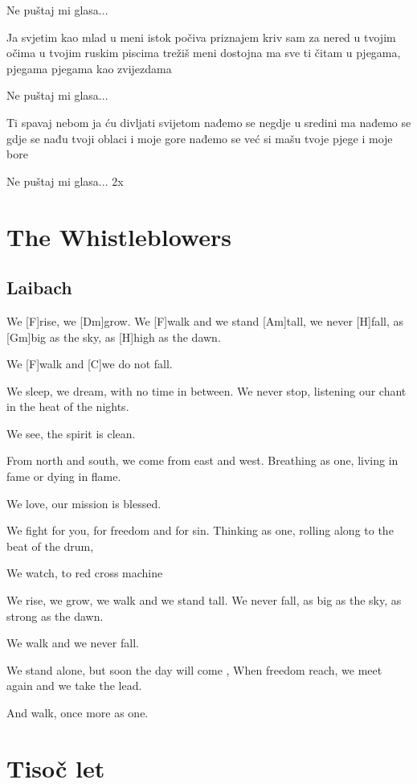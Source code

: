 \documentclass[a4paper,12pt]{article}
\begin{document}
\begin{multicols}{2}
\begin{guitar}
Ne puštaj mi glasa...


Ja svjetim kao mlad 
u meni istok počiva
priznajem kriv sam za nered u tvojim očima
u tvojim ruskim piscima trežiš meni dostojna
ma sve ti čitam u pjegama, pjegama
pjegama kao zvijezdama


Ne puštaj mi glasa...


Ti spavaj nebom ja ću divljati svijetom
nađemo se negdje u sredini
ma nađemo se gdje se nađu
tvoji oblaci i moje gore
nađemo se već si mašu
tvoje pjege i moje bore


Ne puštaj mi glasa... 2x

\end{guitar}
\section{The Whistleblowers}
\subsection*{Laibach}
\begin{guitar}
We [F]rise, we [Dm]grow.
We [F]walk and we stand [Am]tall,
we never [H]fall,
as [Gm]big as the sky,
as [H]high as the dawn.

We [F]walk and [C]we do not fall.

We sleep, we dream,
with no time in between.
We never stop,
listening our chant in the heat of the nights.

We see, the spirit is clean.

From north and south,
we come from east and west.
Breathing as one,
living in fame or dying in flame.

We love, our mission is blessed.

We fight for you,
for freedom and for sin.
Thinking as one,
rolling along to the beat of the drum,

We watch,
to red cross machine

We rise, we grow,
we walk and we stand tall.
We never fall,
as big as the sky, as strong as the dawn.

We walk and we never fall.

We stand alone,
but soon the day will come ,
When freedom reach,
we meet again and we take the lead.

And walk, once more as one.

\end{guitar}
\section{Tisoč let}

\end{multicols}
\end{document}

